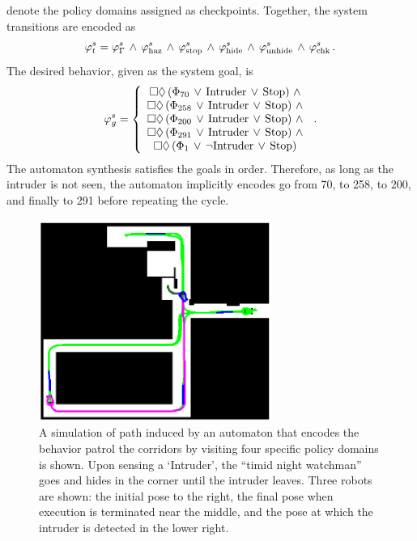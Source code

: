 denote the policy domains assigned as checkpoints.  Together, the system transitions
are encoded as
\[\varphi_t^s = \varphi_\Gamma^s\,\AND\,\varphi_\mrm{haz}^s\,\AND\,
\varphi_\mrm{stop}^s\,\AND\,\varphi_\mrm{hide}^s\,\AND\,\varphi_\mrm{unhide}^s\,\AND\,\varphi_\mrm{chk}^s\,.\]
The desired behavior, given as the system goal, is
\[\varphi_g^s=\left\{
\bba{c}
\ALWAYS\EVENTUALLY\prl{\CP_{70}\,\OR\,\mrm{Intruder}\,\OR\,\STOP}\,\AND\\
\ALWAYS\EVENTUALLY\prl{\CP_{258}\,\OR\,\mrm{Intruder}\,\OR\,\STOP}\,\AND\\
\ALWAYS\EVENTUALLY\prl{\CP_{200}\,\OR\,\mrm{Intruder}\,\OR\,\STOP}\,\AND\\
\ALWAYS\EVENTUALLY\prl{\CP_{291}\,\OR\,\mrm{Intruder}\,\OR\,\STOP}\,\AND\\
\ALWAYS\EVENTUALLY\prl{\CP_1\,\OR\,\NOT\mrm{Intruder}\,\OR\,\STOP}
\eba
\right.
\,.
\]
The automaton synthesis satisfies the goals in order.  Therefore, as long as the
intruder is not seen, the automaton implicitly encodes go from 70, to 258, to 200,
and finally to 291 before repeating the cycle. 
 
\begin{figure}[bt]
  \centering 
   \includegraphics[width=3in]{graphics/AutRnd5_Sim8_path.eps}

   \caption[`LAGR' timid night watchman.]{A simulation of path induced by an
     automaton that encodes the behavior patrol the corridors by visiting four
     specific policy domains is shown.  Upon sensing a `Intruder', the ``timid night
     watchman'' goes and hides in the corner until the intruder leaves.  Three robots
     are shown: the initial pose to the right, the final pose when execution is
     terminated near the middle, and the pose at which the intruder is detected in
     the lower right.  }
   \label{fig:lagr_Aautomaton_full_path}
\end{figure}

